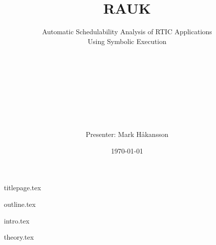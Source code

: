 \documentclass[10pt]{beamer}
\title[RAUK]{
    \hspace{1cm} \\
    \Huge RAUK}
\subtitle{
    Automatic Schedulability Analysis of RTIC Applications \\
    Using Symbolic Execution}
\author{
    \hspace{1cm} \\
    \hspace{1cm} \\
    \hspace{1cm} \\
    \hspace{1cm} \\
    \hspace{1cm} \\
    \hspace{1cm} \\
    \hspace{1cm} \\
    \hspace{1cm} \\
    Presenter: Mark Håkansson}
\institute{
    \hspace{1cm} \\
    Supervisor: Prof. Per Lindgren \\
    Luleå University of Technology}
\date{\today}
\begin{document}
{titlepage.tex}

{outline.tex}

{intro.tex}

{theory.tex}
\end{document}

